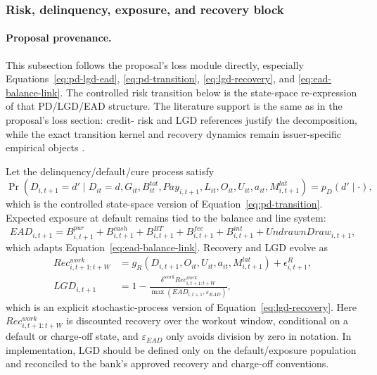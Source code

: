 \documentclass[11pt]{article}
\newcommand{\1}{\mathbf{1}}
\begin{document}
\subsubsection{Risk, delinquency, exposure, and recovery block}
\label{subsec:state-space-risk-block}

\paragraph{Proposal provenance.}
This subsection follows the proposal's loss module directly, especially
Equations~\eqref{eq:pd-lgd-ead}, \eqref{eq:pd-transition},
\eqref{eq:lgd-recovery}, and \eqref{eq:ead-balance-link}. The controlled risk
transition below is the state-space re-expression of that PD/LGD/EAD structure.
The literature support is the same as in the proposal's loss section: credit-
risk and LGD references justify the decomposition, while the exact transition
kernel and recovery dynamics remain issuer-specific empirical objects
\citep{hand1997credit,thomas2000survey,lessmann2015benchmarking,
schuermann2004lgd}.

Let the delinquency/default/cure process satisfy
\begin{equation}
  \Pr(D_{i,t+1}=d'\mid D_{it}=d,G_{it},B^{tot}_{it},Pay_{i,t+1},L_{it},O_{it},U_{it},a_{it},M^{lat}_{i,t+1})
  = p_D(d'\mid\cdot),
  \label{eq:ss-delinquency-transition}
\end{equation}
which is the controlled state-space version of Equation~\eqref{eq:pd-transition}.
Expected exposure at default remains tied to the balance and line system:
\begin{equation}
  EAD_{i,t+1}
  =
  B^{pur}_{i,t+1}+B^{cash}_{i,t+1}+B^{BT}_{i,t+1}+B^{fee}_{i,t+1}+B^{int}_{i,t+1}
  + UndrawnDraw_{i,t+1},
  \label{eq:ss-ead-identity}
\end{equation}
which adapts Equation~\eqref{eq:ead-balance-link}. Recovery and LGD evolve as
\begin{align}
  Rec^{work}_{i,t+1:t+W}
    &= g_R(D_{i,t+1},O_{it},U_{it},a_{it},M^{lat}_{i,t+1})
       + \epsilon^R_{i,t+1},
       \label{eq:ss-recovery-transition}\\
  LGD_{i,t+1}
    &=
    1-\frac{\delta^{work}Rec^{work}_{i,t+1:t+W}}
            {\max(EAD_{i,t+1},\varepsilon_{EAD})},
       \label{eq:ss-lgd-identity}
\end{align}
which is an explicit stochastic-process version of Equation~\eqref{eq:lgd-recovery}.
Here $Rec^{work}_{i,t+1:t+W}$ is discounted recovery over the workout window,
conditional on a default or charge-off state, and $\varepsilon_{EAD}$ only avoids
division by zero in notation. In implementation, LGD should be defined only on
the default/exposure population and reconciled to the bank's approved recovery
and charge-off conventions.
\end{document}
